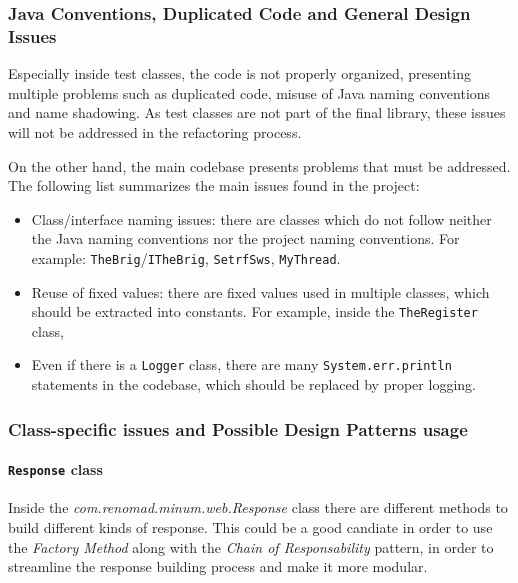 \subsubsection{Java Conventions, Duplicated Code and General Design Issues}

Especially inside test classes, the code is not properly organized, presenting multiple problems such as duplicated code, misuse of Java naming conventions and name shadowing. As test classes are not part of the final library, these issues will not be addressed in the refactoring process.

On the other hand, the main codebase presents problems that must be addressed. The following list summarizes the main issues found in the project:

\begin{itemize}
	\item Class/interface naming issues: there are classes which do not follow neither the Java naming conventions nor the project naming conventions. For example: \texttt{TheBrig}/\texttt{ITheBrig}, \texttt{SetrfSws}, \texttt{MyThread}.
	\item Reuse of fixed values: there are fixed values used in multiple classes, which should be extracted into constants. For example, inside the \texttt{TheRegister} class,
	\item Even if there is a \texttt{Logger} class, there are many \texttt{System.err.println} statements in the codebase, which should be replaced by proper logging.
\end{itemize}

\subsubsection{Class-specific issues and Possible Design Patterns usage}

\paragraph*{\texttt{Response} class} Inside the \textit{com.renomad.minum.web.Response} class there are different methods to build different kinds of response. This could be a good candiate in order to use the \textit{Factory Method} along with the \textit{Chain of Responsability} pattern, in order to streamline the response building process and make it more modular.

